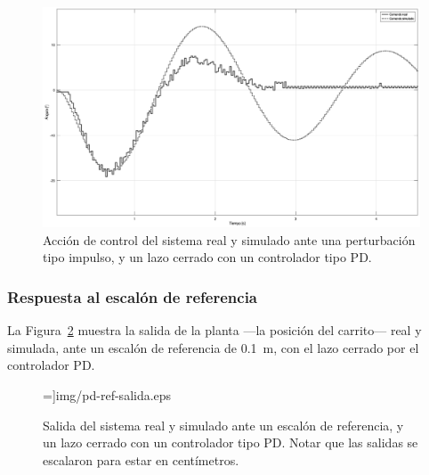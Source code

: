 \begin{figure}[!htbp]
    \centering
    \includegraphics[width=\linewidth]{img/pd-pert-cont.eps}
    \caption{Acción de control del sistema real y simulado ante una perturbación tipo impulso, y un lazo cerrado con un controlador tipo PD.}
    \label{fig:pd-pert-cont}
\end{figure}

\subsubsection{Respuesta al escalón de referencia}

La Figura~\ref{fig:pd-ref-salida} muestra la salida de la planta ---la posición del carrito--- real y simulada, ante un escalón de referencia de \qty{0.1}{\m}, con el lazo cerrado por el controlador PD.


\begin{figure}[!htbp]
    \centering
    =\linewidth]{img/pd-ref-salida.eps}
    \caption{Salida del sistema real y simulado ante un escalón de referencia, y un lazo cerrado con un controlador tipo PD. Notar que las salidas se escalaron para estar en centímetros.}
    \label{fig:pd-ref-salida}
\end{figure}

